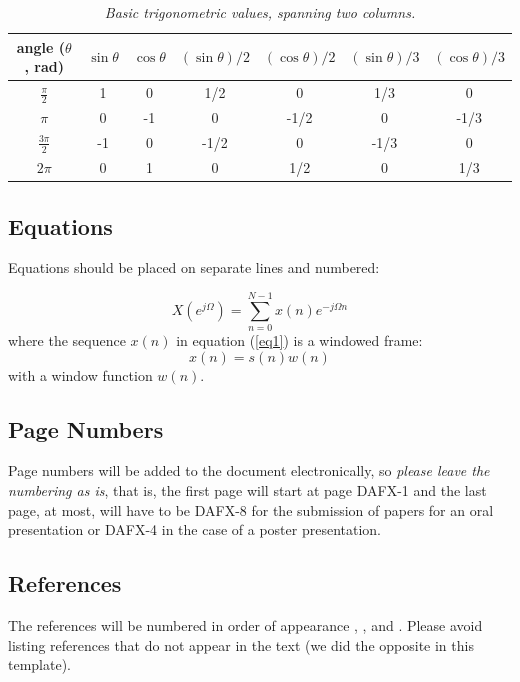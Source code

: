 \documentclass[twoside,a4paper]{article}
\begin{document}
\begin{table}[htdp]
  \caption{{\it Basic trigonometric values, spanning two columns.}}
  \begin{center}
    \begin{tabular}{|c|c|c|c|c|c|c|}\hline
        angle ($\theta$, rad) & $\sin \theta$ & $\cos \theta $ & $(\sin \theta)/2 $ & $(\cos \theta) /2 $ & $(\sin \theta)/3 $ & $(\cos \theta)/3$    \\\hline
    $\frac{\pi}{2}$ & 1 & 0 & 1/2 & 0 & 1/3 & 0 \\
    $\pi$ & 0 & -1 & 0 & -1/2 & 0 & -1/3\\
    $\frac{3\pi}{2}$ & -1 & 0 & -1/2 & 0 & -1/3 & 0 \\
    $2\pi$ & 0 & 1 & 0 & 1/2 & 0 & 1/3\\\hline
    \end{tabular}
  \end{center}
  \label{tab:example2}
\end{table}

\subsection{Equations}
Equations should be placed on separate lines and numbered:

\begin{equation}
X(e^{j\Omega})=\sum_{n=0}^{N-1}x(n)e^{-j\Omega n}
\label{eq1}
\end{equation}
where the sequence $x(n)$ in equation (\ref{eq1}) is a windowed frame:
\begin{equation}
x(n)=s(n) w(n)
\label{eq2}
\end{equation}
with a window function $w(n)$.

\subsection{Page Numbers}
Page numbers will be added to the document electronically, so {\em please leave the numbering as is},
that is, the first page will start at page DAFX-1 and the last page, at most, will have to be DAFX-8
for the submission of papers for an oral presentation or DAFX-4 in the case of a poster presentation.

\subsection{References}
The references will be numbered in order of appearance \cite{Mitra:Kaiser:1993:DSP:handbook}, \cite{Haykin:1991:adaptive:filter}, \cite{Moorer:2000:AES:audio:millenium} and \cite{Nackaerts:2001:ICMC}. Please avoid listing references that do not appear in the text (we did the opposite in this template).
\end{document}
